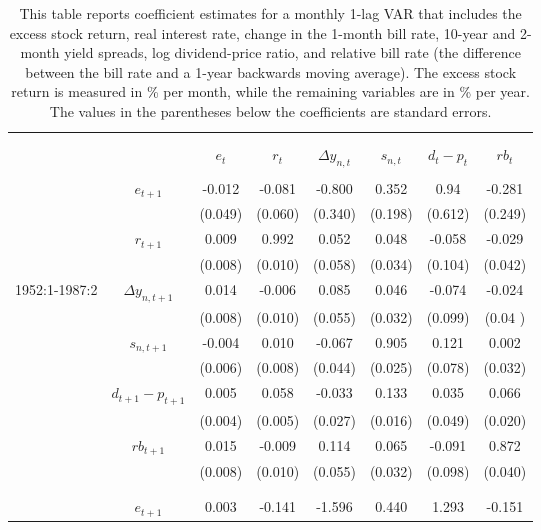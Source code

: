 \documentclass[11pt]{article}
\begin{document}
\begin{center}
\begin{longtable}{rccccccc}
\caption {: VAR Coefficient Estimates} \label{tab:table1} \\
\caption*{This table reports coefficient estimates for a monthly 1-lag VAR that includes the excess stock return, real interest rate, change in the 1-month bill rate, 10-year and 2-month yield spreads, log dividend-price ratio, and relative bill rate (the difference between the bill rate and a 1-year backwards moving average). The excess stock return is measured in \% per month, while the remaining variables are in \% per year. The values in the parentheses below the coefficients are standard errors.}\\ \\
 \hline
 & & $e_t$ & $r_t$ & $\Delta y_{n,t}$ & $s_{n,t}$ & $d_t-p_t$ & $rb_t$ \\ 
  \hline \\
 & $e_{t+1}$ & -0.012 & -0.081 & -0.800 & 0.352 & 0.94 & -0.281 \\ 
  &  & (0.049) & (0.060) & (0.340) & (0.198) & (0.612) & (0.249) \\ 
  & $r_{t+1}$ & 0.009 & 0.992 & 0.052 & 0.048 & -0.058 & -0.029 \\ 
  &   & (0.008) & (0.010) & (0.058) & (0.034) & (0.104) & (0.042) \\ 
  1952:1-1987:2 &  $\Delta y_{n,t+1}$ & 0.014 & -0.006 & 0.085 & 0.046 & -0.074 & -0.024 \\ 
   &  & (0.008) & (0.010) & (0.055) & (0.032) & (0.099) & (0.04 ) \\ 
  &  $s_{n,t+1}$ & -0.004 & 0.010 & -0.067 & 0.905 & 0.121 & 0.002 \\ 
   &  & (0.006) & (0.008) & (0.044) & (0.025) & (0.078) & (0.032) \\ 
  &  $d_{t+1}-p_{t+1}$ & 0.005 & 0.058 & -0.033 & 0.133 & 0.035 & 0.066 \\ 
   &  & (0.004) & (0.005) & (0.027) & (0.016) & (0.049) & (0.020) \\ 
  &  $rb_{t+1}$ & 0.015 & -0.009 & 0.114 & 0.065 & -0.091 & 0.872 \\ 
  &   & (0.008) & (0.010) & (0.055) & (0.032) & (0.098) & (0.040) \\ 
  \\ \hline \\
  &  $e_{t+1}$ & 0.003 & -0.141 & -1.596 & 0.440 & 1.293 & -0.151 \\ 

\end{longtable}
\end{center}
\end{document}
